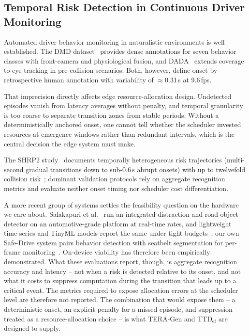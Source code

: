 \documentclass[a4paper,fleqn]{cas-dc}
\newcommand{\TERAGen}{\mbox{TERA-Gen}\xspace}
\begin{document}
\subsection{Temporal Risk Detection in Continuous Driver Monitoring}
\label{sec:rel_dms}
Automated driver behavior monitoring in naturalistic environments is well
established. The DMD dataset~\cite{ortega2020dmd} provides dense annotations
for seven behavior classes with front-camera and physiological fusion, and
DADA~\cite{fang2022dada} extends coverage to eye tracking in pre-collision
scenarios. Both, however, define onset by retrospective human annotation with
variability of $\approx$0.31\,s at 9.6\,fps.

That imprecision directly affects edge resource-allocation design. Undetected
episodes vanish from latency averages without penalty, and temporal granularity
is too coarse to separate transition zones from stable periods. Without a
deterministically anchored onset, one cannot tell whether the scheduler
invested resources at emergence windows rather than redundant intervals, which
is the central decision the edge system must make.

The SHRP2 study~\cite{dingus2016shrp2} documents temporally heterogeneous risk trajectories (multi-second gradual transitions down to sub-0.6\,s abrupt onsets) with up to twelvefold collision risk~\cite{bouhsissin2023driver}; dominant validation protocols rely on aggregate recognition metrics and evaluate neither onset timing nor scheduler cost differentiation.

A more recent group of systems settles the feasibility question on the hardware we
care about. Salakapuri et al.~\cite{salakapuri2025integrated} run an integrated
distraction and road-object detector on an automotive-grade platform at real-time
rates, and lightweight time-series and TinyML models report the same under tight
budgets~\cite{fresta2025cognitive,tinydl2025driverstate}; our own Safe-Drive system
pairs behavior detection with seatbelt segmentation for per-frame
monitoring~\cite{albarello2025safedrive}. On-device viability has therefore been empirically demonstrated. What these evaluations report, though, is aggregate recognition accuracy and
latency -- not when a risk is detected relative to its onset, and not what it costs
to suppress computation during the transition that leads up to a critical event. The metrics required to expose allocation errors at the scheduler level are therefore not reported. The combination that would expose them -- a deterministic onset, an explicit
penalty for a missed episode, and suppression treated as a resource-allocation
choice -- is what \TERAGen and $\mathrm{TTD}_{\mathrm{ef}}$ are designed to supply.
\end{document}
